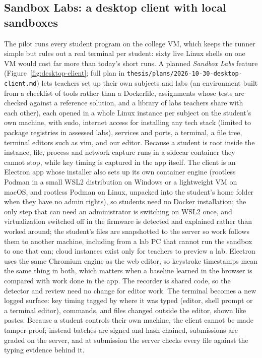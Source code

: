 \subsection{Sandbox Labs: a desktop client with local sandboxes}
\label{sec:desktop-client}
The pilot runs every student program on the college VM, which keeps the
runner simple but rules out a real terminal per student: sixty live Linux
shells on one VM would cost far more than today's short runs. A planned
\emph{Sandbox Labs} feature (Figure~\ref{fig:desktop-client}; full plan in
\texttt{thesis/plans/2026-10-30-desktop-client.md}) lets teachers set up their own
subjects and labs (an environment built from a checklist of tools rather than
a Dockerfile, assignments whose tests are checked against a reference
solution, and a library of labs teachers share with each other), each opened in a whole Linux instance per subject on the student's own
machine, with sudo, internet access for installing any tech stack (limited to
package registries in assessed labs), services and ports, a terminal, a file
tree, terminal editors such as vim, and our editor. Because a student is root
inside the instance, file, process and network capture runs in a sidecar
container they cannot stop, while key timing is captured in the app itself.
The client is an Electron app whose installer also sets up its own container
engine (rootless Podman in a small WSL2 distribution on Windows or a
lightweight VM on macOS, and rootless Podman on Linux, unpacked into the
student's home folder when they have no admin rights), so students need no
Docker installation; the only step that can need an administrator is
switching on WSL2 once, and virtualization switched off in the firmware is
detected and explained rather than worked around; the
student's files are snapshotted to the server so work follows them to another
machine, including from a lab PC that cannot run the sandbox to one that can;
cloud instances exist only for teachers to preview a lab. Electron uses the same Chromium engine as the web editor, so
keystroke timestamps mean the same thing in both, which matters when a
baseline learned in the browser is compared with work done in the app. The
recorder is shared code, so the detector and review need no change for editor
work. The terminal becomes a new logged surface: key timing tagged by where it
was typed (editor, shell prompt or a terminal editor), commands, and files
changed outside the editor, shown like pastes. Because a student controls
their own machine, the client cannot be made tamper-proof; instead batches are
signed and hash-chained, submissions are graded on the server, and at
submission the server checks every file against the typing evidence behind it.

